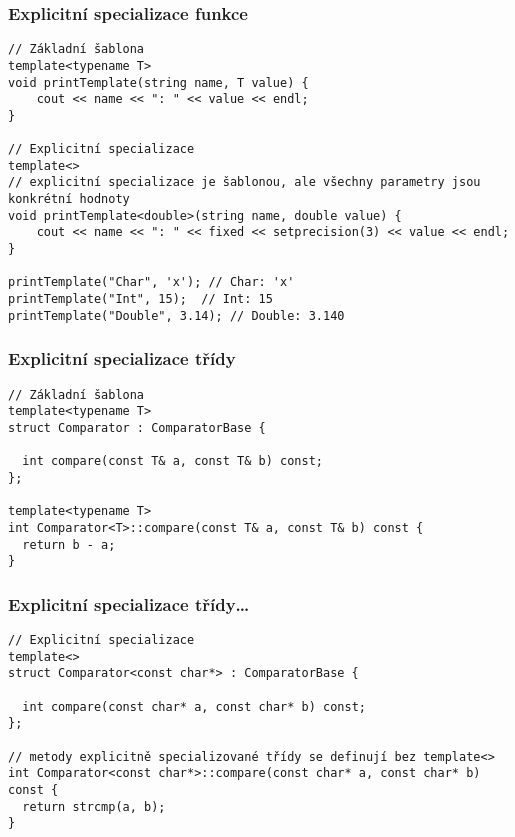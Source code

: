 \begin{frame}[fragile]
\frametitle{Explicitní specializace funkce}
\begin{yesblock}
\begin{lstlisting}[basicstyle=\small]
// Základní šablona
template<typename T>
void printTemplate(string name, T value) {
	cout << name << ": " << value << endl;
}

// Explicitní specializace
template<> 
// explicitní specializace je šablonou, ale všechny parametry jsou konkrétní hodnoty
void printTemplate<double>(string name, double value) {
	cout << name << ": " << fixed << setprecision(3) << value << endl;
}

printTemplate("Char", 'x'); // Char: 'x'
printTemplate("Int", 15);  // Int: 15
printTemplate("Double", 3.14); // Double: 3.140
\end{lstlisting}
\end{yesblock}
\end{frame}




\begin{frame}[fragile]
\frametitle{Explicitní specializace třídy}
\begin{yesblock}
\begin{lstlisting}[basicstyle=\small]
// Základní šablona
template<typename T>
struct Comparator : ComparatorBase {

  int compare(const T& a, const T& b) const;
};

template<typename T>
int Comparator<T>::compare(const T& a, const T& b) const {
  return b - a;
}
\end{lstlisting}
\end{yesblock}
\end{frame}


\begin{frame}[fragile]
\frametitle{Explicitní specializace třídy\ldots}
\begin{yesblock}
\begin{lstlisting}[basicstyle=\small]
// Explicitní specializace
template<>
struct Comparator<const char*> : ComparatorBase {

  int compare(const char* a, const char* b) const;
};

// metody explicitně specializované třídy se definují bez template<>
int Comparator<const char*>::compare(const char* a, const char* b) const {
  return strcmp(a, b);
}	
\end{lstlisting}
\end{yesblock}
\end{frame}


